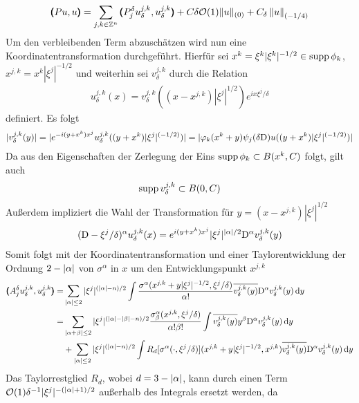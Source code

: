 \begin{align}
\pmb(Pu,u\pmb) = \sum_{j,k\in\mathbb Z^n} \pmb(P^\delta_j u_\delta^{j,k},u_\delta^{j,k}\pmb) + C\delta\mathcal O(1)\lVert u\rVert _{(0)} + C_\delta \left\lVert u\right\rVert _{(-1/4)}
\end{align}
Um den verbleibenden Term abzuschätzen wird nun eine Koordinatentransformation durchgeführt. Hierfür sei $x^k = \xi^k |\xi^k|^{-1/2}\in\operatorname{supp} \phi_k$, $x^{j,k}=x^k |\xi^j|^{-1/2}$ und weiterhin sei $v^{j,k}_\delta$ durch die Relation
\begin{align}
u^{j,k}_\delta(x) = v^{j,k}_\delta ((x-x^{j,k})|\xi^j|^{1/2}) e^{ix\xi^j/\delta}
\end{align}
definiert. Es folgt
\begin{align}
|v^{j,k}_\delta(y)| = \lvert e^{-i(y+x^k)x^j}u^{j,k}_\delta((y+x^k)|\xi^j|^{(-1/2)})\rvert = |\varphi_k(x^k+y)\psi_j(\delta\mathrm D)u((y+x^k)|\xi^j|^{(-1/2)})|
\end{align}
Da aus den Eigenschaften der Zerlegung der Eins $\operatorname{supp} \phi_k \subset B(x^k,C)$ folgt, gilt auch
\begin{align}
\operatorname{supp} v^{j,k}_\delta \subset B(0,C)
\end{align}
Außerdem impliziert die Wahl der Transformation für $y=(x-x^{j,k})|\xi^j|^{1/2}$
\begin{align}
(\mathrm D - \xi^j/\delta)^\alpha u^{j,k}_\delta(x)=  e^{i(y+x^k)x^j}|\xi^j|^{\lvert\alpha\rvert/2}\mathrm D^\alpha v^{j,k}_\delta(y)
\end{align}
Somit folgt mit der Koordinatentransformation und einer Taylorentwicklung der Ordnung $2-\lvert\alpha\rvert$ von $\sigma^\alpha$ in $x$ um den Entwicklungspunkt $x^{j,k}$
\begin{align}
\pmb(A^\delta_j u_\delta^{j,k},u_\delta^{j,k}\pmb)
=& \sum_{\lvert\alpha\rvert\le 2} |\xi^j|^{(\lvert\alpha\rvert-n)/2}\int \frac{\sigma^\alpha(x^{j,k}+y|\xi^j|^{-1/2},\xi^j/\delta)}{\alpha!}\overline{v^{j,k}_\delta(y)}\mathrm D^\alpha v^{j,k}_\delta(y)\,\mathrm d y\nonumber\\ \label{termnachkoordtransf}
=& \sum_{\lvert\alpha+\beta\rvert\le 2}|\xi^j|^{(\lvert\alpha\rvert-\lvert\beta\rvert-n)/2} \frac{\sigma^\alpha_\beta(x^{j,k},\xi^j/\delta)}{\alpha!\beta!}\int\overline{v^{j,k}_\delta(y)}y^\beta\mathrm D^\alpha v^{j,k}_\delta(y)\,\mathrm d y\\
&+\sum_{\lvert\alpha\rvert\le 2}|\xi^j|^{(\lvert\alpha\rvert-n)/2}\int R_{d}[\sigma^\alpha(\cdot,\xi^j/\delta)](x^{j,k}+y|\xi^j|^{-1/2},x^{j,k})\overline{v^{j,k}_\delta(y)}\mathrm D^\alpha v^{j,k}_\delta(y)\,\mathrm d y\nonumber
\end{align}
Das Taylorrestglied $R_d$, wobei $d=3-\lvert\alpha\rvert$, kann durch einen Term $\mathcal O(1)\delta^{-1}|\xi^j|^{-(\lvert\alpha\rvert+1)/2}$ außerhalb des Integrals ersetzt werden, da
